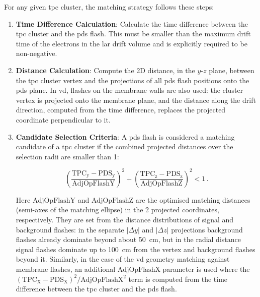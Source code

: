 For any given \gls{tpc} cluster, the matching strategy follows these steps:

\begin{enumerate}
    \item\textbf{Time Difference Calculation}: Calculate the time difference between the \gls{tpc} cluster and the \gls{pds} flash. This must be smaller than the maximum drift time of the electrons in the \gls{lar} drift volume and is explicitly required to be non-negative.

    \item\textbf{Distance Calculation}: Compute the 2D distance, in the $y$-$z$ plane, between the \gls{tpc} cluster vertex and the projections of all \gls{pds} flash positions onto the \gls{pds} plane. In \gls{vd}, flashes on the membrane walls are also used: the cluster vertex is projected onto the membrane plane, and the distance along the drift direction, computed from the time difference, replaces the projected coordinate perpendicular to it.

    \item\textbf{Candidate Selection Criteria}: A \gls{pds} flash is considered a matching candidate of a \gls{tpc} cluster if the combined projected distances over the selection radii are smaller than 1:

    \begin{equation}
        \left(\dfrac{\text{TPC}_\text{y} - \text{PDS}_\text{y}}{\text{AdjOpFlashY}}\right)^2 + \left(\dfrac{\text{TPC}_\text{z} - \text{PDS}_\text{z}}{\text{AdjOpFlashZ}}\right)^2 < 1\,.
    \end{equation}

    Here \( \text{AdjOpFlashY} \) and \( \text{AdjOpFlashZ} \) are the optimised matching distances (semi-axes of the matching ellipse) in the 2 projected coordinates, respectively. They are set from the distance distributions of signal and background flashes: in the separate $|\Delta y|$ and $|\Delta z|$ projections background flashes already dominate beyond about \SI{50}{\centi\meter}, but in the radial distance signal flashes dominate up to \SI{100}{\centi\meter} from the vertex and background flashes beyond it. Similarly, in the case of the \gls{vd} geometry matching against membrane flashes, an additional \( \text{AdjOpFlashX} \) parameter is used where the $(\text{TPC}_\text{X} - \text{PDS}_\text{X})^2 / \text{AdjOpFlashX}^2$ term is computed from the time difference between the \gls{tpc} cluster and the \gls{pds} flash.


\end{enumerate}
